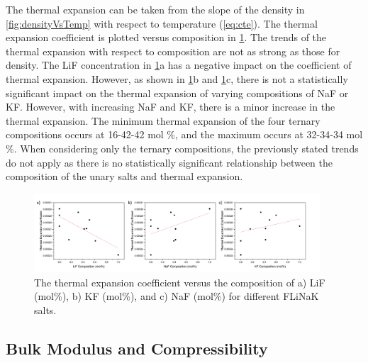 \documentclass[preprint,12pt]{elsarticle}
\begin{document}
The thermal expansion can be taken from the slope of the density in \cref{fig:densityVsTemp} with respect to temperature (\cref{eq:cte}). The thermal expansion coefficient is plotted versus composition in \cref{fig:therm3comp}. The trends of the thermal expansion with respect to composition are not as strong as those for density. The LiF concentration in \cref{fig:therm3comp}a has a negative impact on the coefficient of thermal expansion. However, as shown in \cref{fig:therm3comp}b and \cref{fig:therm3comp}c, there is not a statistically significant impact on the thermal expansion of varying compositions of NaF or KF. However, with increasing NaF and KF, there is a minor increase in the thermal expansion. The minimum thermal expansion of the four ternary compositions occurs at 16-42-42 mol \%, and the maximum occurs at 32-34-34 mol \%. When considering only the ternary compositions, the previously stated trends do not apply as there is no statistically significant relationship between the composition of the unary salts and thermal expansion.

\begin{figure}[!h]
    \centering
    \includegraphics[width=0.95\textwidth]{thermalAll3_correctOrder.jpg}
    \caption{The thermal expansion coefficient versus the composition of a) LiF (mol\%), b) KF (mol\%), and c) NaF (mol\%) for different FLiNaK salts.}
    \label{fig:therm3comp}
\end{figure}


\FloatBarrier

\subsection{Bulk Modulus and Compressibility}
\end{document}
